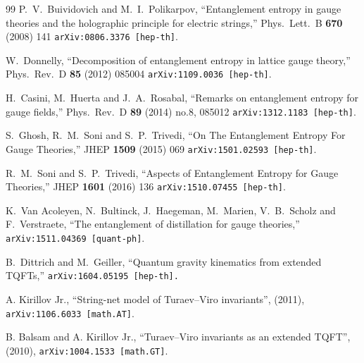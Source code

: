\documentclass[nofootinbib,superscriptaddress,eqsecnum,tightenlines,11pt]{revtex4-1}
\begin{document}
\begin{thebibliography}{99}
 P.~V.~Buividovich and M.~I.~Polikarpov,
  ``Entanglement entropy in gauge theories and the holographic principle for electric strings,''
  Phys.\ Lett.\ B {\bf 670} (2008) 141
  \texttt{arXiv:0806.3376 [hep-th]}.
  
   W.~Donnelly,
  ``Decomposition of entanglement entropy in lattice gauge theory,''
  Phys.\ Rev.\ D {\bf 85} (2012) 085004
  \texttt{arXiv:1109.0036 [hep-th]}.
  
   H.~Casini, M.~Huerta and J.~A.~Rosabal,
  ``Remarks on entanglement entropy for gauge fields,''
  Phys.\ Rev.\ D {\bf 89} (2014) no.8,  085012
  \texttt{arXiv:1312.1183 [hep-th]}.
  
   S.~Ghosh, R.~M.~Soni and S.~P.~Trivedi,
  ``On The Entanglement Entropy For Gauge Theories,''
  JHEP {\bf 1509} (2015) 069
  \texttt{arXiv:1501.02593 [hep-th]}.
  
   R.~M.~Soni and S.~P.~Trivedi,
  ``Aspects of Entanglement Entropy for Gauge Theories,''
  JHEP {\bf 1601} (2016) 136
  \texttt{arXiv:1510.07455 [hep-th]}.

 K.~Van Acoleyen, N.~Bultinck, J.~Haegeman, M.~Marien, V.~B.~Scholz and F.~Verstraete,
  ``The entanglement of distillation for gauge theories,''
  \texttt{arXiv:1511.04369 [quant-ph]}.

  B.~Dittrich and M.~Geiller,
  ``Quantum gravity kinematics from extended TQFTs,''
  \texttt{arXiv:1604.05195 [hep-th].}

 A. Kirillov Jr.,
``String-net model of Turaev--Viro invariants'',
(2011), \texttt{arXiv:1106.6033 [math.AT]}.

 B. Balsam and A. Kirillov Jr.,
``Turaev--Viro invariants as an extended TQFT'',
(2010), \texttt{arXiv:1004.1533 [math.GT]}.


\end{thebibliography}
\end{document}
